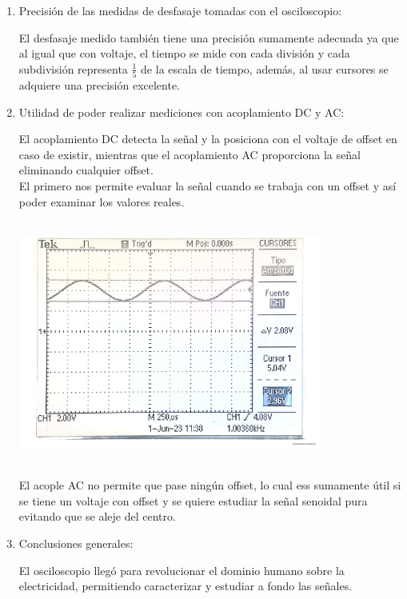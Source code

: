 \documentclass[12pt]{article}
\begin{document}
\begin{enumerate}
		\item Precisión de las medidas de desfasaje
		tomadas con el osciloscopio:
		
		\noindent El desfasaje medido también tiene una precisión sumamente adecuada ya que al igual que con voltaje, el tiempo se mide con cada división y cada subdivisión representa $\frac{1}{5}$ de la escala de tiempo, además, al usar cursores se adquiere una precisión excelente.\\
		
		\item Utilidad de poder realizar mediciones con
		acoplamiento DC y AC:
		
		\noindent El acoplamiento DC detecta la señal y la posiciona con el voltaje de offset en caso de existir, mientras que el acoplamiento AC proporciona la señal eliminando cualquier offset.\\
		
		\noindent El primero nos permite evaluar la señal cuando se trabaja con un offset y así poder examinar los valores reales.
		
		\begin{center}
			\includegraphics[width=10cm,height=8cm]{Img/con_offset}
		\end{center}
	
		\noindent El acople AC no permite que pase ningún offset, lo cual ess sumamente útil si se tiene un voltaje con offset y se quiere estudiar la señal senoidal pura evitando que se aleje del centro.\\
		
		\item Conclusiones generales:
		
		\noindent El osciloscopio llegó para revolucionar el dominio humano sobre la electricidad, permitiendo caracterizar y estudiar a fondo las señales.\\
		

\end{enumerate}
\end{document}
